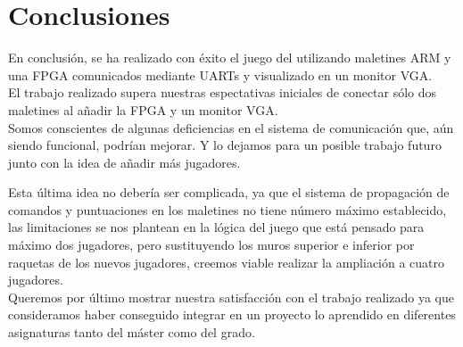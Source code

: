 \section{Conclusiones}
\label{s4:sec:Conclusiones}

En conclusión, se ha realizado con éxito el juego del \pong utilizando
maletines ARM y una FPGA comunicados mediante UARTs y visualizado en
un monitor VGA. \\

El trabajo realizado supera nuestras espectativas iniciales de
conectar sólo dos maletines al añadir la FPGA y un monitor VGA. \\

Somos conscientes de algunas deficiencias en el sistema de
comunicación que, aún siendo funcional, podrían mejorar. Y lo dejamos
para un posible trabajo futuro junto con la idea de añadir más
jugadores.

Esta última idea no debería ser complicada, ya que el sistema de
propagación de comandos y puntuaciones en los maletines no tiene
número máximo establecido, las limitaciones se nos plantean en la
lógica del juego que está pensado para máximo dos jugadores, pero
sustituyendo los muros superior e inferior por raquetas de los nuevos
jugadores, creemos viable realizar la ampliación a cuatro jugadores. \\

Queremos por último mostrar nuestra satisfacción con el trabajo
realizado ya que consideramos haber conseguido integrar en un proyecto
lo aprendido en diferentes asignaturas tanto del máster como del
grado. 
%
%


